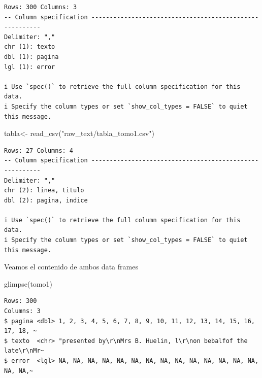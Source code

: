 \documentclass[
  letterpaper,
  DIV=11,
  numbers=noendperiod]{scrreprt}
\newenvironment{Shaded}{\begin{snugshade}}{\end{snugshade}}
\newcommand{\FunctionTok}[1]{\textcolor[rgb]{0.28,0.35,0.67}{#1}}
\newcommand{\NormalTok}[1]{\textcolor[rgb]{0.00,0.23,0.31}{#1}}
\newcommand{\OtherTok}[1]{\textcolor[rgb]{0.00,0.23,0.31}{#1}}
\newcommand{\SpecialCharTok}[1]{\textcolor[rgb]{0.37,0.37,0.37}{#1}}
\newcommand{\StringTok}[1]{\textcolor[rgb]{0.13,0.47,0.30}{#1}}
\begin{document}
\begin{verbatim}
Rows: 300 Columns: 3
-- Column specification --------------------------------------------------------
Delimiter: ","
chr (1): texto
dbl (1): pagina
lgl (1): error

i Use `spec()` to retrieve the full column specification for this data.
i Specify the column types or set `show_col_types = FALSE` to quiet this message.
\end{verbatim}

\begin{Shaded}
\begin{Highlighting}[]
\NormalTok{tabla}\OtherTok{\textless{}{-}} \FunctionTok{read\_csv}\NormalTok{(}\StringTok{"raw\_text/tabla\_tomo1.csv"}\NormalTok{)}
\end{Highlighting}
\end{Shaded}

\begin{verbatim}
Rows: 27 Columns: 4
-- Column specification --------------------------------------------------------
Delimiter: ","
chr (2): linea, titulo
dbl (2): pagina, indice

i Use `spec()` to retrieve the full column specification for this data.
i Specify the column types or set `show_col_types = FALSE` to quiet this message.
\end{verbatim}

Veamos el contenido de ambos data frames

\begin{Shaded}
\begin{Highlighting}[]
\FunctionTok{glimpse}\NormalTok{(tomo1)}
\end{Highlighting}
\end{Shaded}

\begin{verbatim}
Rows: 300
Columns: 3
$ pagina <dbl> 1, 2, 3, 4, 5, 6, 7, 8, 9, 10, 11, 12, 13, 14, 15, 16, 17, 18, ~
$ texto  <chr> "presented by\r\nMrs B. Huelin, l\r\non bebalfof the late\r\nMr~
$ error  <lgl> NA, NA, NA, NA, NA, NA, NA, NA, NA, NA, NA, NA, NA, NA, NA, NA,~
\end{verbatim}

\begin{Shaded}
\end{Shaded}
\end{document}
